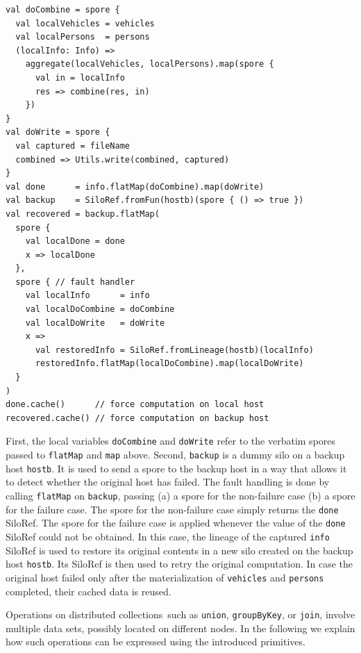 \documentclass[preprint]{sigplanconf}
\theoremstyle{definition}
\theoremstyle{definition}
\begin{document}
\begin{lstlisting}
val doCombine = spore {
  val localVehicles = vehicles
  val localPersons  = persons
  (localInfo: Info) =>
    aggregate(localVehicles, localPersons).map(spore {
      val in = localInfo
      res => combine(res, in)
    })
}
val doWrite = spore {
  val captured = fileName
  combined => Utils.write(combined, captured)
}
val done      = info.flatMap(doCombine).map(doWrite)
val backup    = SiloRef.fromFun(hostb)(spore { () => true })
val recovered = backup.flatMap(
  spore {
    val localDone = done
    x => localDone
  },
  spore { // fault handler
    val localInfo      = info
    val localDoCombine = doCombine
    val localDoWrite   = doWrite
    x =>
      val restoredInfo = SiloRef.fromLineage(hostb)(localInfo)
      restoredInfo.flatMap(localDoCombine).map(localDoWrite)
  }
)
done.cache()      // force computation on local host
recovered.cache() // force computation on backup host
\end{lstlisting}
\noindent
First, the local variables \verb|doCombine| and \verb|doWrite| refer to the
verbatim spores passed to \verb|flatMap| and \verb|map| above. Second,
\verb|backup| is a dummy silo on a backup host \verb|hostb|. It is used to
send a spore to the backup host in a way that allows it to detect whether the
original host has failed. The fault handling is done by calling \verb|flatMap|
on \verb|backup|, passing (a) a spore for the non-failure case  (b) a spore
for the failure case. The spore for the non-failure case simply returns the
\verb|done| SiloRef. The spore for the failure case is applied whenever the
value of the \verb|done| SiloRef could not be obtained. In this case, the
lineage of the captured \verb|info| SiloRef is used to restore its original
contents in a new silo created on the backup host \verb|hostb|. Its SiloRef is
then used to retry the original computation. In case the original host failed
only after the materialization of \verb|vehicles| and \verb|persons|
completed, their cached data is reused.






Operations on distributed collections~such as \verb|union|, \verb|groupByKey|, or
\verb|join|, involve multiple data sets, possibly located on different nodes.
In the following we explain how such operations can be expressed using the
introduced primitives.
\end{document}
